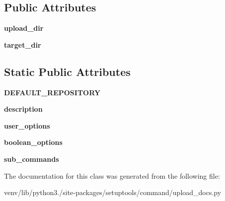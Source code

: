 \subsection*{Public Attributes}
\begin{DoxyCompactItemize}
\item 
\mbox{\label{classsetuptools_1_1command_1_1upload__docs_1_1upload__docs_ae351d8d8b61208a3bb38774ba56d99c1}} 
{\bfseries upload\+\_\+dir}
\item 
\mbox{\label{classsetuptools_1_1command_1_1upload__docs_1_1upload__docs_a3e5f02483c643f4c7fec04ee49eb5d08}} 
{\bfseries target\+\_\+dir}
\end{DoxyCompactItemize}
\subsection*{Static Public Attributes}
\begin{DoxyCompactItemize}
\item 
\mbox{\label{classsetuptools_1_1command_1_1upload__docs_1_1upload__docs_a149ce25f0132b11c4d4bb1e29e605a45}} 
{\bfseries D\+E\+F\+A\+U\+L\+T\+\_\+\+R\+E\+P\+O\+S\+I\+T\+O\+RY}
\item 
\mbox{\label{classsetuptools_1_1command_1_1upload__docs_1_1upload__docs_aafa137b3ec2bc84928352e4df1cd90d3}} 
{\bfseries description}
\item 
\mbox{\label{classsetuptools_1_1command_1_1upload__docs_1_1upload__docs_abacc6dfad6f5e4dfa9c2e29dca2182a3}} 
{\bfseries user\+\_\+options}
\item 
\mbox{\label{classsetuptools_1_1command_1_1upload__docs_1_1upload__docs_a1efabf142789be7ad52a639b3fec1a96}} 
{\bfseries boolean\+\_\+options}
\item 
\mbox{\label{classsetuptools_1_1command_1_1upload__docs_1_1upload__docs_a1181aff8d36ec61815285c4061f5c9bf}} 
{\bfseries sub\+\_\+commands}
\end{DoxyCompactItemize}


The documentation for this class was generated from the following file\+:\begin{DoxyCompactItemize}
\item 
venv/lib/python3./site-\/packages/setuptools/command/upload\+\_\+docs.\+py\end{DoxyCompactItemize}
